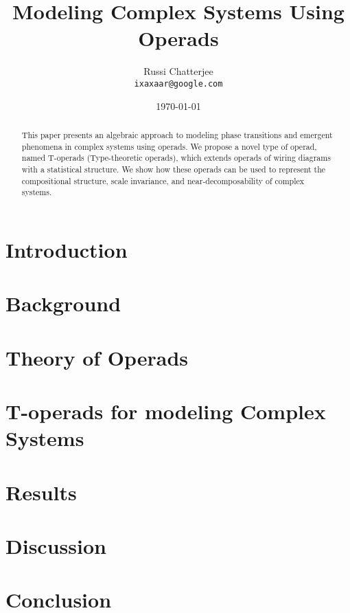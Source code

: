 \documentclass[12pt,a4paper]{article}
\title{Modeling Complex Systems Using Operads}
\author{Russi Chatterjee \\ \texttt{ixaxaar@google.com}}
\date{\today}
\begin{document}
\maketitle

\thispagestyle{empty}

\begin{abstract}
\noindent
This paper presents an algebraic approach to modeling phase transitions and emergent phenomena in complex systems using operads. We propose a novel type of operad, named T-operads (Type-theoretic operads), which extends operads of wiring diagrams with a statistical structure. We show how these operads can be used to represent the compositional structure, scale invariance, and near-decomposability of complex systems.
\end{abstract}

\vspace{1cm}
\section{Introduction}


\section{Background}


\section{Theory of Operads}


\section{T-operads for modeling Complex Systems}


\section{Results}


\section{Discussion}


\section{Conclusion}




\end{document}
